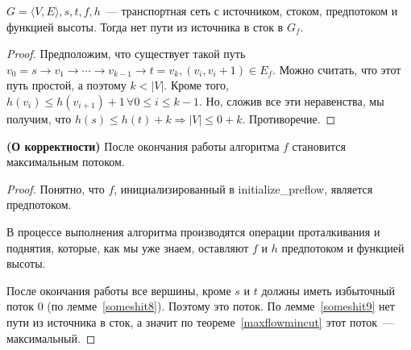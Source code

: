 \begin{lemma}\label{someshit9}
	$G=\langle V,E\rangle,s,t,f,h$~--- транспортная сеть с источником, стоком, предпотоком и функцией высоты. Тогда нет пути из источника в сток в $G_f$.
\end{lemma}
\begin{proof}
	Предположим, что существует такой путь $v_0=s\to v_1\to\cdots\to v_{k-1}\to t=v_k, (v_i,v_i+1)\in E_f$. 
	Можно считать, что этот путь простой, а поэтому $k<|V|$.
	Кроме того, $h(v_i)\le h(v_{i+1})+1\,\forall 0\le i\le k-1$. Но, сложив все эти неравенства, мы получим, что $h(s)\le h(t)+k\Rightarrow |V|\le 0+k$. Противоречие.
\end{proof}
\begin{theorem} {\bf (О корректности)}
	После окончания работы алгоритма $f$ становится максимальным потоком.
\end{theorem}
\begin{proof}
	Понятно, что $f$, инициализированный в initialize\_preflow, является предпотоком.
	
	В процессе выполнения алгоритма производятся операции проталкивания и поднятия, которые, как мы уже знаем, оставляют $f$ и $h$ предпотоком и функцией высоты.
	
	После окончания работы все вершины, кроме $s$ и $t$ должны иметь избыточный поток 0 (по лемме~\ref{someshit8}). Поэтому это поток. По лемме~\ref{someshit9} нет пути из источника в сток, а значит по теореме~\ref{maxflowmincut} этот поток~--- максимальный.
\end{proof}

